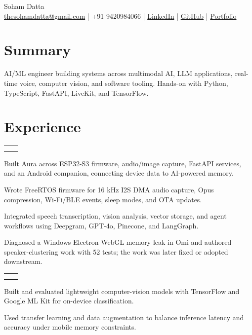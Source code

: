 \documentclass[]{resume-openfont}
\makeatletter
\newcommand{\resumeHeading}[3]{%
\noindent\begin{tabularx}{\textwidth}{@{}X r@{}}
{\runsubsection{#1}} & {\location{#2}} \\
[-1pt]
{\descript{#3}} & \\
[-1pt]
\end{tabularx}
}
\makeatother
\begin{document}
\begin{center}
{\customLatoBlack\fontsize{22pt}{24pt}\selectfont Soham Datta}\\[3pt]
\small \href{mailto:thesohamdatta@gmail.com}{thesohamdatta@gmail.com} \quad | \quad +91 9420984066 \quad | \quad
\href{https://www.linkedin.com/in/thesohamdatta/}{LinkedIn} \quad | \quad
\href{https://github.com/thesohamdatta}{GitHub} \quad | \quad
\href{https://sohamdatta.framer.ai}{Portfolio}
\end{center}

\section{Summary}
\small AI/ML engineer building systems across multimodal AI, LLM applications, real-time voice, computer vision, and software tooling. Hands-on with Python, TypeScript, FastAPI, LiveKit, and TensorFlow.

\section{Experience}
\resumeHeading{Aura}{Pune, India | Jun 2025 -- Present}{Founder · AI Systems / Edge / Wearable Computing}
\begin{bullets}
\item Built Aura across ESP32-S3 firmware, audio/image capture, FastAPI services, and an Android companion, connecting device data to AI-powered memory.
\item Wrote FreeRTOS firmware for 16 kHz I2S DMA audio capture, Opus compression, Wi-Fi/BLE events, sleep modes, and OTA updates.
\item Integrated speech transcription, vision analysis, vector storage, and agent workflows using Deepgram, GPT-4o, Pinecone, and LangGraph.
\item Diagnosed a Windows Electron WebGL memory leak in Omi and authored speaker-clustering work with 52 tests; the work was later fixed or adopted downstream.
\end{bullets}
\sectionsep

\resumeHeading{AICTE via Google}{India | Oct 2024 -- Dec 2024}{AI \& ML Intern · Computer Vision / Edge ML}
\begin{bullets}
\item Built and evaluated lightweight computer-vision models with TensorFlow and Google ML Kit for on-device classification.
\item Used transfer learning and data augmentation to balance inference latency and accuracy under mobile memory constraints.
\end{bullets}
\sectionsep
\end{document}
